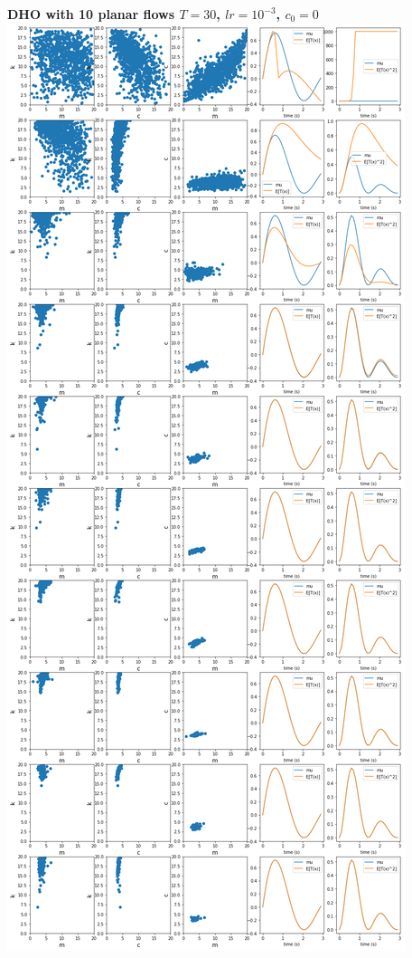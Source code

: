 \documentclass[11pt]{article}
\begin{document}
\begin{center}
\textbf{DHO with 10 planar flows $T=30$, $lr=10^{-3}$, $c_0=0$}
\includegraphics[scale=.25]{images/DHO_dist_10P_c=0_lr=-3_T=30.png} \\
\end{center}
\end{document}

